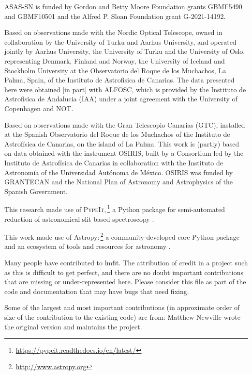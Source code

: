 \begin{acknowledgements}
ASAS-SN is funded by Gordon and Betty Moore Foundation grants
GBMF5490 and GBMF10501 and the Alfred P. Sloan Foundation
grant G-2021-14192.

Based on observations made with the Nordic Optical Telescope, owned in collaboration by the University of Turku and Aarhus University, and operated jointly by Aarhus University, the University of Turku and the University of Oslo, representing Denmark, Finland and Norway, the University of Iceland and Stockholm University at the Observatorio del Roque de los Muchachos, La Palma, Spain, of the Instituto de Astrofisica de Canarias. The data presented here were obtained [in part] with ALFOSC, which is provided by the Instituto de Astrofisica de Andalucia (IAA) under a joint agreement with the University of Copenhagen and NOT.

Based on observations made with the Gran Telescopio Canarias (GTC), installed at the Spanish Observatorio del Roque de los Muchachos of the Instituto de Astrofísica de Canarias, on the island of La Palma. This work is (partly) based on data obtained with the instrument OSIRIS, built by a Consortium led by the Instituto de Astrofísica de Canarias in collaboration with the Instituto de Astronomía of the Universidad Autónoma de México. OSIRIS was funded by GRANTECAN and the National Plan of Astronomy and Astrophysics of the Spanish Government.

This research made use of \textsc{PypeIt},\,\footnote{\url{https://pypeit.readthedocs.io/en/latest/}}
a Python package for semi-automated reduction of astronomical slit-based spectroscopy
\citep{pypeit:joss_pub, pypeit:zenodo}.

This work made use of Astropy:\,\footnote{\url{http://www.astropy.org}} a community-developed core Python package and an ecosystem of tools and resources for astronomy \citep{astropy:2013, astropy:2018, astropy:2022}.

Many people have contributed to lmfit. The attribution of credit in a project such as this is difficult to get perfect, and there are no doubt important contributions that are missing or under-represented here. Please consider this file as part of the code and documentation that may have bugs that need fixing.

Some of the largest and most important contributions (in approximate order of size of the contribution to the existing code) are from:
 Matthew Newville wrote the original version and maintains the project.
 

\end{acknowledgements}
